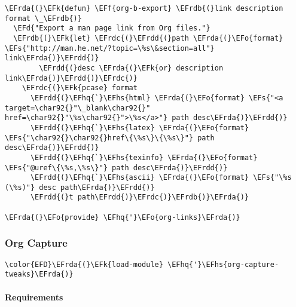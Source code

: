 \documentclass[a4wide,10pt]{article}
\newcommand{\EFs}[1]{\textcolor{EFs}{#1}} %
\newcommand{\EFd}[1]{\textcolor{EFd}{#1}} %
\newcommand{\EFk}[1]{\textcolor{EFk}{#1}} %
\newcommand{\EFf}[1]{\textcolor{EFf}{#1}} %
\newcommand{\EFo}[1]{\textcolor{EFo}{#1}} %
\newcommand{\EFhq}[1]{\textcolor{EFhq}{#1}} %
\newcommand{\EFhs}[1]{\textcolor{EFhs}{#1}} %
\newcommand{\EFrda}[1]{\textcolor{EFrda}{#1}} %
\newcommand{\EFrdb}[1]{\textcolor{EFrdb}{#1}} %
\newcommand{\EFrdc}[1]{\textcolor{EFrdc}{#1}} %
\newcommand{\EFrdd}[1]{\textcolor{EFrdd}{#1}} %
\begin{document}
\begin{Code}
\begin{Verbatim}
\EFrda{(}\EFk{defun} \EFf{org-b-export} \EFrdb{(}link description format \_\EFrdb{)}
  \EFd{"Export a man page link from Org files."}
  \EFrdb{(}\EFk{let} \EFrdc{(}\EFrdd{(}path \EFrda{(}\EFo{format} \EFs{"http://man.he.net/?topic=\%s\&section=all"} link\EFrda{)}\EFrdd{)}
        \EFrdd{(}desc \EFrda{(}\EFk{or} description link\EFrda{)}\EFrdd{)}\EFrdc{)}
    \EFrdc{(}\EFk{pcase} format
      \EFrdd{(}\EFhq{`}\EFhs{html} \EFrda{(}\EFo{format} \EFs{"<a target=\char92{}"\_blank\char92{}" href=\char92{}"\%s\char92{}">\%s</a>"} path desc\EFrda{)}\EFrdd{)}
      \EFrdd{(}\EFhq{`}\EFhs{latex} \EFrda{(}\EFo{format} \EFs{"\char92{}\char92{}href\{\%s\}\{\%s\}"} path desc\EFrda{)}\EFrdd{)}
      \EFrdd{(}\EFhq{`}\EFhs{texinfo} \EFrda{(}\EFo{format} \EFs{"@uref\{\%s,\%s\}"} path desc\EFrda{)}\EFrdd{)}
      \EFrdd{(}\EFhq{`}\EFhs{ascii} \EFrda{(}\EFo{format} \EFs{"\%s (\%s)"} desc path\EFrda{)}\EFrdd{)}
      \EFrdd{(}t path\EFrdd{)}\EFrdc{)}\EFrdb{)}\EFrda{)}

\EFrda{(}\EFo{provide} \EFhq{'}\EFo{org-links}\EFrda{)}
\end{Verbatim}
\end{Code}
\subsubsection{Org Capture}
\label{sec:org6b6e281}
\begin{Code}
\begin{Verbatim}
\color{EFD}\EFrda{(}\EFk{load-module} \EFhq{'}\EFhs{org-capture-tweaks}\EFrda{)}
\end{Verbatim}
\end{Code}
\paragraph{Requirements}
\label{sec:org0a408d2}
\end{document}
